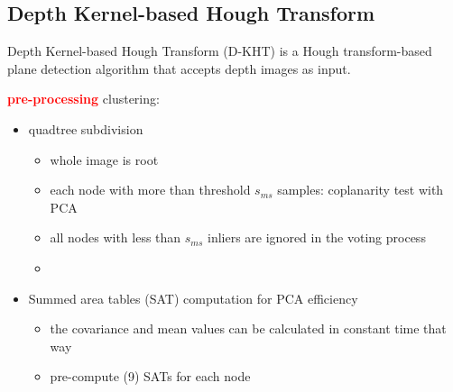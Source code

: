 \documentclass[main.tex]{subfiles}
\begin{document}
\subsection{Depth Kernel-based Hough Transform}
Depth Kernel-based Hough Transform (D-KHT) \cite{Vera_Lucio_Fernandes_Velho_2018} is a Hough transform-based plane detection
algorithm that accepts depth images as input.

\textbf{\textcolor{red}{pre-processing}}
clustering:
\begin{itemize}
    \item quadtree subdivision
          \begin{itemize}
              \item whole image is root
              \item each node with more than threshold $s_{ms}$ samples: coplanarity test with PCA
              \item all nodes with less than $s_{ms}$ inliers are ignored in the voting process
              \item
          \end{itemize}
    \item Summed area tables (SAT) computation for PCA efficiency
          \begin{itemize}
              \item the covariance and mean values can be calculated in constant time that way
              \item pre-compute (9) SATs for each node
          \end{itemize}
\end{itemize}
\end{document}
